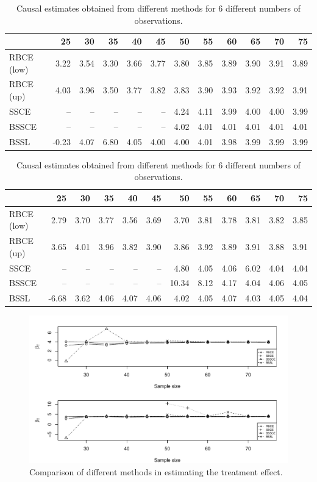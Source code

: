 \documentclass[preprint,12pt]{elsarticle}
\begin{document}
\begin{table}[ht]
\caption{Causal estimates obtained from different methods
for 6 different
numbers of observations.}\label{tab:causal}
\centering
{}
\begin{tabular}{l|rrrrrrrrrrr}
  \hline
 & 25 & 30 & 35 & 40 & 45 & 50 & 55 & 60 & 65 & 70 & 75 \\ 
  \hline
RBCE (low) & 3.22 & 3.54 & 3.30 & 3.66 & 3.77 & 3.80 & 3.85 & 3.89 & 3.90 & 3.91 & 3.89 \\ 
  RBCE (up) & 4.03 & 3.96 & 3.50 & 3.77 & 3.82 & 3.83 & 3.90 & 3.93 & 3.92 & 3.92 & 3.91 \\ 
  SSCE & -- & -- & -- & -- & -- & 4.24 & 4.11 & 3.99 & 4.00 & 4.00 & 3.99 \\ 
  BSSCE & -- & -- & -- & -- & -- & 4.02 & 4.01 & 4.01 & 4.01 & 4.01 & 4.01 \\ 
  BSSL & -0.23 & 4.07 & 6.80 & 4.05 & 4.00 & 4.00 & 4.01 & 3.98 & 3.99 & 3.99 & 3.99 \\ 
   \hline
\end{tabular}
\begin{tabular}{l|rrrrrrrrrrr}
  \hline
 & 25 & 30 & 35 & 40 & 45 & 50 & 55 & 60 & 65 & 70 & 75 \\ 
  \hline
RBCE (low) & 2.79 & 3.70 & 3.77 & 3.56 & 3.69 & 3.70 & 3.81 & 3.78 & 3.81 & 3.82 & 3.85 \\ 
  RBCE (up) & 3.65 & 4.01 & 3.96 & 3.82 & 3.90 & 3.86 & 3.92 & 3.89 & 3.91 & 3.88 & 3.91 \\ 
  SSCE & -- & -- & -- & -- & -- & 4.80 & 4.05 & 4.06 & 6.02 & 4.04 & 4.04 \\ 
  BSSCE & -- & -- & -- & -- & -- & 10.34 & 8.12 & 4.17 & 4.04 & 4.06 & 4.05 \\ 
  BSSL & -6.68 & 3.62 & 4.06 & 4.07 & 4.06 & 4.02 & 4.05 & 4.07 & 4.03 & 4.05 & 4.04 \\ 
   \hline
\end{tabular}
\end{table}

\begin{figure}
    \centering
    \includegraphics[width = 0.9\linewidth]{RBCE_comp.pdf}
    \caption{Comparison of different methods in estimating the treatment effect.}
    \label{fig:comp:trt}
\end{figure}
\end{document}
